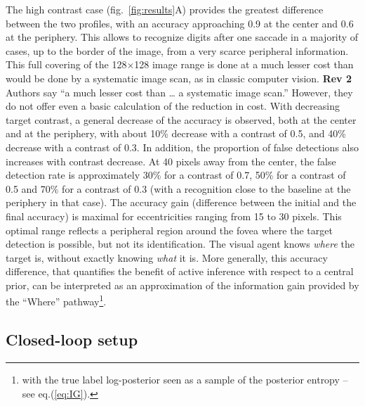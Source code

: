 The high contrast case (fig.~\ref{fig:results}A) provides the greatest difference between the two profiles, with an accuracy approaching 0.9 at the center and 0.6 at the periphery. This allows to recognize digits after one saccade in a majority of cases, up to the border of the image, from a very scarce peripheral information. This full covering of the 128$\times$128 image range is done at a much lesser cost than would be done by a systematic image scan, as in classic computer vision.
{\color{red} \textbf{Rev 2} Authors say “a much lesser cost than … a systematic image scan.” However, they do not offer even a basic calculation of the reduction in cost.
}
With decreasing target contrast, a general decrease of the accuracy is observed, both at the center and at the periphery, with about 10\% decrease with a contrast of 0.5, and 40\% decrease with a contrast of 0.3. In addition, the proportion of false detections also increases with contrast decrease. At 40 pixels away from the center, the false detection rate is approximately 30\% for a contrast of 0.7, 50\% for a contrast of 0.5 and 70\% for a contrast of 0.3 (with a recognition close to the baseline at the periphery in that case). The accuracy gain (difference between the initial and the final accuracy) is maximal for eccentricities ranging from 15 to 30 pixels. This optimal range reflects a peripheral region around the fovea where the target detection is possible, but not its identification. The visual agent knows \emph{where} the target is, without exactly knowing \emph{what} it is.
More generally, this accuracy difference, that quantifies the benefit of active inference with respect to a central prior, can be interpreted as an approximation of the information gain provided by the ``Where'' pathway\footnote{with the true label log-posterior seen as a sample of the posterior entropy -- see eq.(\ref{eq:IG}).}.





\subsection*{Closed-loop setup}

